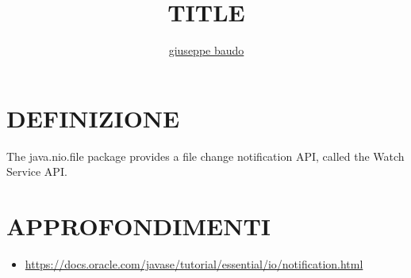 \documentclass[a4paper,10pt]{article}
\title{TITLE}
\author{\href{http://www.baudo.hol.es}{giuseppe baudo}}
\begin{document}
\maketitle

\section{DEFINIZIONE}
The java.nio.file package provides a file change notification API, called the Watch Service API.

\section{APPROFONDIMENTI}
\begin{itemize}
 \item \url{https://docs.oracle.com/javase/tutorial/essential/io/notification.html}
\end{itemize}
\end{document}
